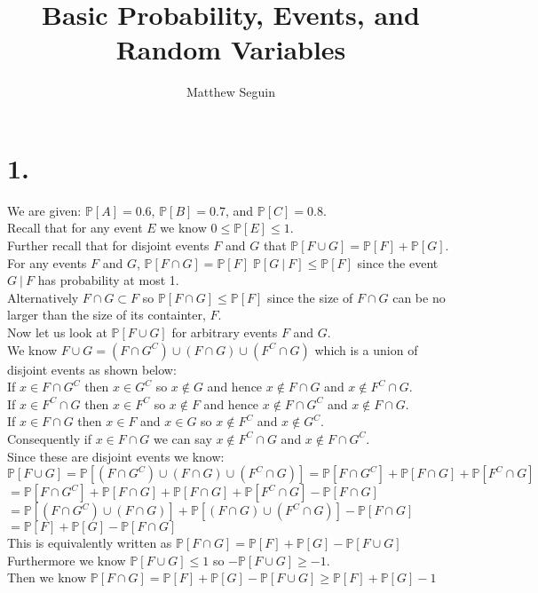 \documentclass{article}
\title{Basic Probability, Events, and Random Variables}
\author{Matthew Seguin}
\date{}
\begin{document}
\maketitle

\section*{1.}
\begin{center}
\doublespacing
    We are given: $\mathbb{P}[A] = 0.6$, $\mathbb{P}[B] = 0.7$, and $\mathbb{P}[C] = 0.8$.
    \\Recall that for any event $E$ we know $0\leq\mathbb{P}[E]\leq 1$.
    \\Further recall that for disjoint events $F$ and $G$ that $\mathbb{P}[F\cup G] =\mathbb{P}[F] +\mathbb{P}[G]$.
    \break
    \\For any events $F$ and $G$, $\mathbb{P}[F\cap G] = \mathbb{P}[F]\;\mathbb{P}[G\:|\:F]\leq\mathbb{P}[F]$ since the event $G\:|\:F$ has probability at most 1.
    \\Alternatively $F\cap G\subset F$ so $\mathbb{P}[F\cap G]\leq\mathbb{P}[F]$ since the size of $F\cap G$ can be no larger than the size of its containter, $F$.
    \break
    \\Now let us look at $\mathbb{P}[F\cup G]$ for arbitrary events $F$ and $G$.
    \\We know $F\cup G = (F\cap G^C)\cup (F\cap G)\cup (F^C\cap G)$ which is a union of disjoint events as shown below:
    \\If $x\in F\cap G^C$ then $x\in G^C$ so $x\notin G$ and hence $x\notin F\cap G$ and $x\notin F^C\cap G$.
    \\If $x\in F^C\cap G$ then $x\in F^C$ so $x\notin F$ and hence $x\notin F\cap G^C$ and $x\notin F\cap G$.
    \\If $x\in F\cap G$ then $x\in F$ and $x\in G$ so $x\notin F^C$ and $x\notin G^C$.
    \\Consequently if $x\in F\cap G$ we can say $x\notin F^C\cap G$ and $x\notin F\cap G^C$.
    \\Since these are disjoint events we know:
    \\$\mathbb{P}[F\cup G] =\mathbb{P}[(F\cap G^C)\cup (F\cap G)\cup (F^C\cap G)] =\mathbb{P}[F\cap G^C] +\mathbb{P}[F\cap G] +\mathbb{P}[F^C\cap G]$
    \\$=\mathbb{P}[F\cap G^C] +\mathbb{P}[F\cap G] +\mathbb{P}[F\cap G] +\mathbb{P}[F^C\cap G] -\mathbb{P}[F\cap G]$
    \\$=\mathbb{P}[(F\cap G^C)\cup (F\cap G)] +\mathbb{P}[(F\cap G)\cup (F^C\cap G)] -\mathbb{P}[F\cap G]$
    \\$=\mathbb{P}[F] +\mathbb{P}[G] -\mathbb{P}[F\cap G]$
    \\This is equivalently written as $\mathbb{P}[F\cap G] =\mathbb{P}[F] +\mathbb{P}[G] -\mathbb{P}[F\cup G]$
    \\Furthermore we know $\mathbb{P}[F\cup G]\leq 1$ so $-\mathbb{P}[F\cup G]\geq -1$.
    \\Then we know $\mathbb{P}[F\cap G] =\mathbb{P}[F] +\mathbb{P}[G] -\mathbb{P}[F\cup G]\geq\mathbb{P}[F] +\mathbb{P}[G] - 1$
\end{center}
\end{document}
